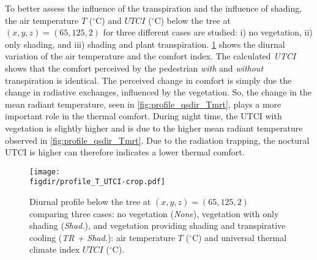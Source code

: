 To better assess the influence of the transpiration and the influence of shading, the air temperature $T$  ($^{\circ}$C) and $UTCI$  ($^{\circ}$C) below the tree at $(x,y,z) = (65, 125, 2)$ for three different cases are studied: i) no vegetation, ii) only shading, and iii) shading and plant transpiration. \cref{fig:profile_T_UTCI} shows the diurnal variation of the air temperature and the comfort index. The calculated \textit{UTCI} shows that the comfort perceived by the pedestrian \textit{with} and \textit{without} transpiration is identical. The perceived change in comfort is simply due the change in radiative exchanges, influenced by the vegetation. So, the change in the mean radiant temperature, seen in \cref{fig:profile_qsdir_Tmrt}, plays a more important role in the thermal comfort. During night time, the UTCI with vegetation is slightly higher and is due to the higher mean radiant temperature observed in \cref{fig:profile_qsdir_Tmrt}. Due to the radiation trapping, the noctural UTCI is higher can therefore indicates a lower thermal comfort. 

\begin{figure}[t]
	\centering
	\texttt{[image: \\figdir/profile\_T\_UTCI-crop.pdf]}
	\caption{Diurnal profile below the tree at $(x,y,z) = (65, 125, 2)$ comparing three cases: no vegetation (\textit{None}), vegetation with only shading (\textit{Shad.}), and vegetation providing shading and transpirative cooling (\textit{TR + Shad.}):  air temperature $T$  ($^{\circ}$C) and  universal thermal climate index $\textit{UTCI}$ ($^{\circ}$C). }
	\label{fig:profile_T_UTCI}
\end{figure}




